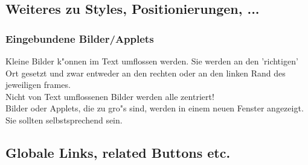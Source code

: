 


\subsection{Weiteres zu Styles, Positionierungen, ...}

\subsubsection{Eingebundene Bilder/Applets}
    Kleine Bilder k"onnen im Text umflossen werden. Sie werden
    an den 'richtigen' Ort gesetzt und zwar entweder an den rechten
    oder an den linken Rand des jeweiligen frames.\\
    Nicht von Text umflossenen Bilder werden alle zentriert!\\
    Bilder oder Applets, die zu gro"s sind, werden in einem neuen
    Fenster angezeigt. Sie sollten selbstsprechend sein.



\subsection{Globale Links, related Buttons etc.}\label{globaleLinks}

